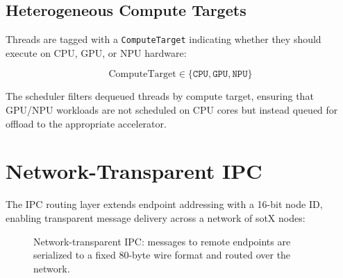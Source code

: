\documentclass[11pt,letterpaper]{article}
\theoremstyle{definition}
\begin{document}
\subsection{Heterogeneous Compute Targets}

Threads are tagged with a \texttt{ComputeTarget} indicating whether they
should execute on CPU, GPU, or NPU hardware:

\begin{equation}
\text{ComputeTarget} \in \{\texttt{CPU}, \texttt{GPU}, \texttt{NPU}\}
\end{equation}

The scheduler filters dequeued threads by compute target, ensuring that
GPU/NPU workloads are not scheduled on CPU cores but instead queued for
offload to the appropriate accelerator.

\section{Network-Transparent IPC}
\label{sec:swarm}

The IPC routing layer extends endpoint addressing with a 16-bit node ID,
enabling transparent message delivery across a network of sotX nodes:

\begin{figure}[h]
\centering
{}
\caption{Network-transparent IPC: messages to remote endpoints are
serialized to a fixed 80-byte wire format and routed over the network.}
\label{fig:swarm}
\end{figure}
\end{document}

